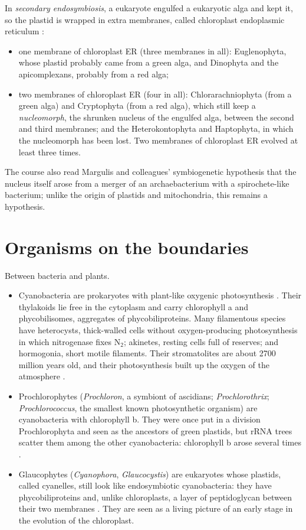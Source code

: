 In \emph{secondary endosymbiosis}, a
eukaryote engulfed a eukaryotic alga and kept
it, so the plastid is wrapped in extra
membranes, called chloroplast endoplasmic
reticulum \cite[Parts IV and
V]{lee2008phycology}:
\begin{itemize}
\item one membrane of chloroplast ER (three
membranes in all): Euglenophyta, whose
plastid probably came from a green alga, and
Dinophyta and the apicomplexans, probably
from a red alga;
\item two membranes of chloroplast ER (four
in all): Chlorarachniophyta (from a green
alga) and Cryptophyta (from a red alga),
which still keep a \emph{nucleomorph}, the
shrunken nucleus of the engulfed alga,
between the second and third membranes; and
the Heterokontophyta and Haptophyta, in which
the nucleomorph has been lost. Two membranes
of chloroplast ER evolved at least three
times.
\end{itemize}

The course also read Margulis and colleagues'
symbiogenetic hypothesis that the nucleus
itself arose from a merger of an
archaebacterium with a spirochete-like
bacterium; unlike the origin of plastids and
mitochondria, this remains a hypothesis.

\section{Organisms on the boundaries}
\label{section-boundaries}

Between bacteria and plants.
\begin{itemize}
\item Cyanobacteria are prokaryotes with
plant-like oxygenic photosynthesis
\cite[Chapter 2]{lee2008phycology}. Their
thylakoids lie free in the cytoplasm and
carry chlorophyll a and phycobilisomes,
aggregates of phycobiliproteins. Many
filamentous species have heterocysts,
thick-walled cells without oxygen-producing
photosynthesis in which nitrogenase fixes
$\mathrm{N_2}$; akinetes, resting cells full
of reserves; and hormogonia, short motile
filaments. Their stromatolites are about 2700
million years old, and their photosynthesis
built up the oxygen of the atmosphere
\cite[Chapter 1]{lee2008phycology}.
\item Prochlorophytes (\emph{Prochloron}, a
symbiont of ascidians; \emph{Prochlorothrix};
\emph{Prochlorococcus}, the smallest known
photosynthetic organism) are cyanobacteria
with chlorophyll b. They were once put in a
division Prochlorophyta and seen as the
ancestors of green plastids, but rRNA trees
scatter them among the other cyanobacteria:
chlorophyll b arose several times
\cite[Chapter 2]{lee2008phycology}
\cite[Chapter 13]{evert2013raven}.
\item Glaucophytes (\emph{Cyanophora},
\emph{Glaucocystis}) are eukaryotes whose
plastids, called cyanelles, still look like
endosymbiotic cyanobacteria: they have
phycobiliproteins and, unlike chloroplasts, a
layer of peptidoglycan between their two
membranes \cite[Chapter 3]{lee2008phycology}
\cite[Chapter 25]{willey2008prescott}. They
are seen as a living picture of an early
stage in the evolution of the chloroplast.
\end{itemize}

